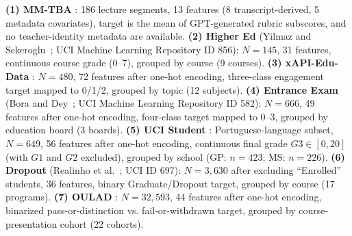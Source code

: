 \documentclass[10pt,letterpaper]{wlscirep}
\begin{document}
\begin{table}[H]
\centering
\caption{Overview of the seven audited educational datasets.}
\label{tab:dataset_overview}
%
\end{table}

\textbf{(1) MM-TBA} \citep{Huang2025}: 186 lecture segments, 13 features (8 transcript-derived, 5 metadata covariates), target is the mean of GPT-generated rubric subscores, and no teacher-identity metadata are available. \textbf{(2) Higher Ed} (Yilmaz and Sekeroglu~\citep{Yilmaz2020}; UCI Machine Learning Repository ID 856): $N=145$, 31 features, continuous course grade (0--7), grouped by course (9 courses). \textbf{(3) xAPI-Edu-Data} \citep{Amrieh2016}: $N=480$, 72 features after one-hot encoding, three-class engagement target mapped to 0/1/2, grouped by topic (12 subjects). \textbf{(4) Entrance Exam} (Bora and Dey~\citep{Bora2021}; UCI Machine Learning Repository ID 582): $N=666$, 49 features after one-hot encoding, four-class target mapped to 0--3, grouped by education board (3 boards). \textbf{(5) UCI Student} \citep{Cortez2008}: Portuguese-language subset, $N=649$, 56 features after one-hot encoding, continuous final grade $G3 \in [0, 20]$ (with $G1$ and $G2$ excluded), grouped by school (GP: $n=423$; MS: $n=226$). \textbf{(6) Dropout} (Realinho et al.~\citep{Realinho2022}; UCI ID 697): $N=3{,}630$ after excluding ``Enrolled'' students, 36 features, binary Graduate/Dropout target, grouped by course (17 programs). \textbf{(7) OULAD} \citep{Kuzilek2017}: $N=32{,}593$, 44 features after one-hot encoding, binarized pass-or-distinction vs. fail-or-withdrawn target, grouped by course-presentation cohort (22 cohorts).
\end{document}
